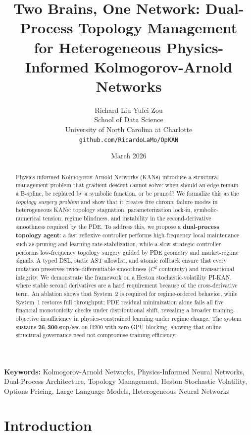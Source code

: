 \documentclass[11pt,a4paper]{article}
\title{\textbf{Two Brains, One Network: Dual-Process Topology Management\\
for Heterogeneous Physics-Informed Kolmogorov-Arnold Networks}}
\author{
  Richard Liu \quad Yufei Zou \\
  School of Data Science \\
  University of North Carolina at Charlotte \\
  \texttt{github.com/RicardoLaMo/OpKAN}
}
\date{March 2026}
\begin{document}
\maketitle

\begin{abstract}
Physics-informed Kolmogorov-Arnold Networks (KANs) introduce a structural management
problem that gradient descent cannot solve: when should an edge remain a B-spline, be
replaced by a symbolic function, or be pruned? We formalize this as the \emph{topology
surgery problem} and show that it creates five chronic failure modes in heterogeneous
KANs: topology stagnation, parameterization lock-in, symbolic-numerical tension, regime
blindness, and instability in the second-derivative smoothness required by the PDE. To
address this, we propose a \textbf{dual-process topology agent}: a fast reflexive
controller performs high-frequency local maintenance such as pruning and learning-rate
stabilization, while a slow strategic controller performs low-frequency topology surgery
guided by PDE geometry and market-regime signals. A typed DSL, static AST allowlist, and
atomic rollback ensure that every mutation preserves twice-differentiable smoothness
($C^2$ continuity) and transactional integrity. We demonstrate the framework on a Heston
stochastic-volatility PI-KAN, where stable second derivatives are a hard requirement
because of the cross-derivative term. An ablation shows that System~2 is required for
regime-ordered behavior, while System~1 restores full throughput; PDE residual
minimization alone fails all five financial monotonicity checks under distributional
shift, revealing a broader training-objective insufficiency in physics-constrained
learning under regime change. The system sustains $\mathbf{26{,}300}$\,smp/sec on H200
with zero GPU blocking, showing that online structural governance need not compromise
training efficiency.
\end{abstract}

\medskip
\noindent\textbf{Keywords:} Kolmogorov-Arnold Networks, Physics-Informed Neural Networks, Dual-Process Architecture, Topology Management, Heston Stochastic Volatility, Options Pricing, Large Language Models, Heterogeneous Neural Networks

\section{Introduction}
\label{sec:intro}
\end{document}
